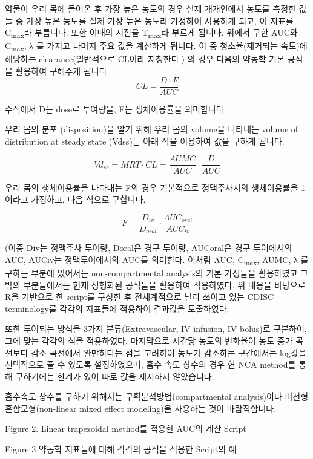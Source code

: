 \documentclass[
  10pt,
]{krantz}
\begin{document}
약물이 우리 몸에 들어온 후 가장 높은 농도의 경우 실제 개개인에서 농도를 측정한 값들 중 가장 높은 농도를 실제 가장 높은 농도라 가정하여 사용하게 되고, 이 지표를 C\textsubscript{max}라 부릅니다. 또한 이때의 시점을 T\textsubscript{max}라 부르게 됩니다.
위에서 구한 AUC와 C\textsubscript{max}, λ 를 가지고 나머지 주요 값을 계산하게 됩니다.
이 중 청소율(제거되는 속도)에 해당하는 clearance(일반적으로 CL이라 지칭한다.) 의 경우 다음의 약동학 기본 공식을 활용하여 구해주게 됩니다.
\begin{equation}
CL = \frac{D \cdot F}{AUC}
\label{eq:clearance}
\end{equation}

수식에서 D는 dose로 투여량을, F는 생체이용률을 의미합니다.

우리 몸의 분포 (disposition)을 알기 위해 우리 몸의 volume을 나타내는 volume of distribution at steady state (Vdss)는 아래 식을 이용하여 값을 구하게 됩니다.

\[
Vd_{ss} = MRT \cdot CL = \frac{AUMC}{AUC} \cdot \frac{D}{AUC}
\]

우리 몸의 생체이용률을 나타내는 F의 경우 기본적으로 정맥주사시의 생체이용률을 1이라고 가정하고, 다음 식으로 구합니다.

\[
F = \frac{D_{iv}}{D_{oral}} \cdot \frac{AUC_{oral}}{AUC_{iv}}
\]

(이중 Div는 정맥주사 투여량, Doral은 경구 투여량, AUCoral은 경구 투여에서의 AUC, AUCiv는 정맥투여에서의 AUC를 의미한다.
이처럼 AUC, C\textsubscript{max}, AUMC, λ 를 구하는 부분에 있어서는 non-compartmental analysis의 기본 가정들을 활용하였고 그 밖의 부분들에서는 현재 정형화된 공식들을 활용하여 적용하였다.
위 내용을 바탕으로 R을 기반으로 한 script를 구성한 후 전세계적으로 널리 쓰이고 있는 CDISC terminology를 각각의 지표들에 적용하여 결과값을 도출하였다.

또한 투여되는 방식을 3가지 분류(Extravascular, IV infusion, IV bolus)로 구분하여, 그에 맞는 각각의 식을 적용하였다.
마지막으로 시간당 농도의 변화율이 농도 증가 곡선보다 감소 곡선에서 완만하다는 점을 고려하여 농도가 감소하는 구간에서는 log값을 선택적으로 줄 수 있도록 설정하였으며, 흡수 속도 상수의 경우 현 NCA method를 통해 구하기에는 한계가 있어 따로 값을 제시하지 않았습니다.

흡수속도 상수를 구하기 위해서는 구획분석방법(compartmental analysis)이나 비선형 혼합모형(non-linear mixed effect modeling)을 사용하는 것이 바람직합니다.

Figure 2. Linear trapezoidal method를 적용한 AUC의 계산 Script

Figure 3 약동학 지표들에 대해 각각의 공식을 적용한 Script의 예
\end{document}
